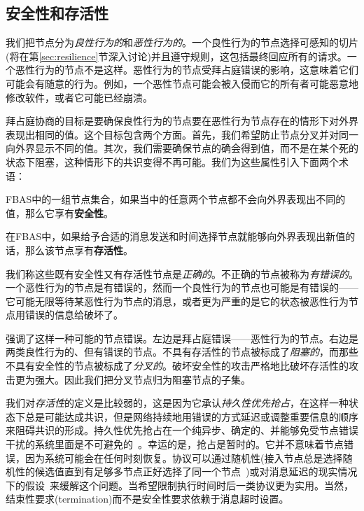 \subsection{安全性和存活性}\label{sec:fba-safe-live}

我们把节点分为\textit{良性行为的}和\textit{恶性行为的}。一个良性行为的节点选择可感知的{\quorum}切片(将在第\ref{sec:resilience}节深入讨论)并且遵守规则，这包括最终回应所有的请求。一个恶性行为的节点不是这样。恶性行为的节点受拜占庭错误的影响，这意味着它们可能会有随意的行为。例如，一个恶性节点可能会被入侵而它的所有者可能恶意地修改软件，或者它可能已经崩溃。

拜占庭协商的目标是要确保良性行为的节点要在恶性行为节点存在的情形下对外界表现出相同的值。这个目标包含两个方面。首先，我们希望防止节点分叉并对同一{\slot}向外界显示不同的值。其次，我们需要确保节点的确会得到值，而不是在某个死的状态下阻塞，这种情形下的共识变得不再可能。我们为这些属性引入下面两个术语：

\begin{definition}[安全性]
	FBAS中的一组节点集合，如果当中的任意两个节点都不会向外界表现出不同的值，那么它享有{\textbf{安全性}}。
\end{definition}

\begin{definition}[存活性]
	在FBAS中，如果给予合适的消息发送和时间选择节点就能够向外界表现出新值的话，那么该节点享有{\textbf{存活性}}。
\end{definition}

我们称这些既有安全性又有存活性节点是\textit{正确的}。不正确的节点被称为{\textit{有错误的}}。一个恶性行为的节点是有错误的，然而一个良性行为的节点也可能是有错误的——它可能无限等待某恶性行为节点的消息，或者更为严重的是它的状态被恶性行为节点用错误的信息给破坏了。

强调了这样一种可能的节点错误。左边是拜占庭错误——恶性行为的节点。右边是两类良性行为的、但有错误的节点。不具有存活性的节点被标成了\textit{阻塞的}，而那些不具有安全性的节点被标成了\textit{分叉的}。破坏安全性的攻击严格地比破坏存活性的攻击更为强大。因此我们把分叉节点归为阻塞节点的子集。

我们对\textit{存活性}的定义是比较弱的，这是因为它承认\textit{持久性优先抢占}，在这样一种状态下总是可能达成共识，但是网络持续地用错误的方式延迟或调整重要信息的顺序来阻碍共识的形成。持久性优先抢占在一个纯异步、确定的、并能够免受节点错误干扰的系统里面是不可避免的~\cite{Fischer:1985:IDC:3149.214121}。幸运的是，抢占是暂时的。它并不意味着节点错误，因为系统可能会在任何时刻恢复。协议可以通过随机性(接入节点总是选择随机性的候选值直到有足够多节点正好选择了同一个节点~\cite{Ben-Or:1983:AFC:800221.806707,Bracha:1985:ACB:4221.214134})或对消息延迟的现实情况下的假设~\cite{Dwork:1988:CPP:42282.42283}来缓解这个问题。当希望限制执行时间时后一类协议更为实用。当然，结束性要求(termination)而不是安全性要求依赖于消息超时设置。


